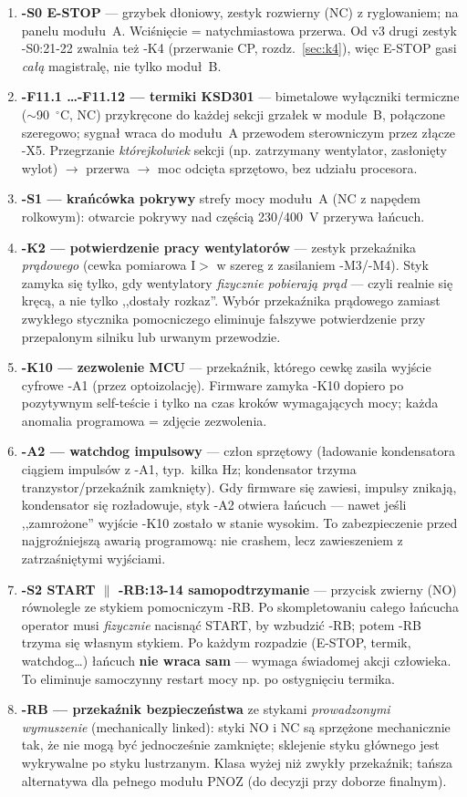 \documentclass[11pt,a4paper]{article}
\begin{document}
\begin{enumerate}
\item \textbf{-S0 E-STOP} --- grzybek dłoniowy, zestyk rozwierny (NC) z ryglowaniem; na panelu
modułu~A. Wciśnięcie = natychmiastowa przerwa. Od v3 drugi zestyk -S0:21-22 zwalnia też -K4
(przerwanie CP, rozdz.~\ref{sec:k4}), więc E-STOP gasi \emph{całą} magistralę, nie tylko moduł~B.
\item \textbf{-F11.1 \ldots -F11.12 --- termiki KSD301} --- bimetalowe wyłączniki termiczne
($\sim$90~$^\circ$C, NC) przykręcone do każdej sekcji grzałek w module~B, połączone szeregowo;
sygnał wraca do modułu~A przewodem sterowniczym przez złącze -X5. Przegrzanie \emph{którejkolwiek}
sekcji (np. zatrzymany wentylator, zasłonięty wylot) $\to$ przerwa $\to$ moc odcięta sprzętowo,
bez udziału procesora.
\item \textbf{-S1 --- krańcówka pokrywy} strefy mocy modułu~A (NC z napędem rolkowym): otwarcie
pokrywy nad częścią 230/400~V przerywa łańcuch.
\item \textbf{-K2 --- potwierdzenie pracy wentylatorów} --- zestyk przekaźnika \emph{prądowego}
(cewka pomiarowa I$>$ w szereg z zasilaniem -M3/-M4). Styk zamyka się tylko, gdy wentylatory
\emph{fizycznie pobierają prąd} --- czyli realnie się kręcą, a nie tylko ,,dostały rozkaz''.
Wybór przekaźnika prądowego zamiast zwykłego stycznika pomocniczego eliminuje fałszywe
potwierdzenie przy przepalonym silniku lub urwanym przewodzie.
\item \textbf{-K10 --- zezwolenie MCU} --- przekaźnik, którego cewkę zasila wyjście cyfrowe -A1
(przez optoizolację). Firmware zamyka -K10 dopiero po pozytywnym self-teście i tylko na czas
kroków wymagających mocy; każda anomalia programowa = zdjęcie zezwolenia.
\item \textbf{-A2 --- watchdog impulsowy} --- człon sprzętowy (ładowanie kondensatora ciągiem
impulsów z -A1, typ.\ kilka Hz; kondensator trzyma tranzystor/przekaźnik zamknięty). Gdy firmware
się zawiesi, impulsy znikają, kondensator się rozładowuje, styk -A2 otwiera łańcuch --- nawet
jeśli ,,zamrożone'' wyjście -K10 zostało w stanie wysokim. To zabezpieczenie przed najgroźniejszą
awarią programową: nie crashem, lecz zawieszeniem z zatrzaśniętymi wyjściami.
\item \textbf{-S2 START $\parallel$ -RB:13-14 samopodtrzymanie} --- przycisk zwierny (NO)
równolegle ze stykiem pomocniczym -RB. Po skompletowaniu całego łańcucha operator musi
\emph{fizycznie} nacisnąć START, by wzbudzić -RB; potem -RB trzyma się własnym stykiem.
Po każdym rozpadzie (E-STOP, termik, watchdog\ldots) łańcuch \textbf{nie wraca sam} --- wymaga
świadomej akcji człowieka. To eliminuje samoczynny restart mocy np. po ostygnięciu termika.
\item \textbf{-RB --- przekaźnik bezpieczeństwa} ze stykami \emph{prowadzonymi wymuszenie}
(mechanically linked): styki NO i NC są sprzężone mechanicznie tak, że nie mogą być jednocześnie
zamknięte; sklejenie styku głównego jest wykrywalne po styku lustrzanym. Klasa wyżej niż zwykły
przekaźnik; tańsza alternatywa dla pełnego modułu PNOZ (do decyzji przy doborze finalnym).
\end{enumerate}
\end{document}
